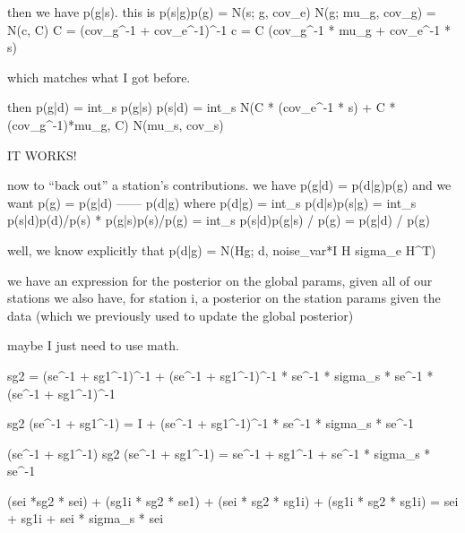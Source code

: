 \documentclass{article}
\begin{document}
then we have p(g|s). this is
p(s|g)p(g) = N(s; g, cov_e) N(g; mu_g, cov_g)
           = N(c, C)
C = (cov_g^-1 + cov_e^-1)^-1
c = C (cov_g^-1 * mu_g + cov_e^-1 * s)

which matches what I got before.

then p(g|d) = int_s p(g|s) p(s|d)
            = int_s N(C * (cov_e^-1 * s) + C * (cov_g^-1)*mu_g, C) N(mu_s, cov_s) 

IT WORKS!

now to ``back out'' a station's contributions.
we have p(g|d) = p(d|g)p(g)
and we want
p(g) = p(g|d)
       ------
       p(d|g)
where p(d|g) = int_s p(d|s)p(s|g)
             = int_s p(s|d)p(d)/p(s) * p(g|s)p(s)/p(g)
             = int_s p(s|d)p(g|s) / p(g)
             = p(g|d) / p(g)

well, we know explicitly that p(d|g) = N(Hg; d, noise_var*I H sigma_e H^T)

we have an expression for the posterior on the global params, given all of our stations
we also have, for station i, a posterior on the station params given the data
(which we previously used to update the global posterior)

maybe I just need to use math.

sg2 = (se^-1 + sg1^-1)^-1 + (se^-1 + sg1^-1)^-1 * se^-1 * sigma_s * se^-1 * (se^-1 + sg1^-1)^-1

sg2 (se^-1 + sg1^-1) = I + (se^-1 + sg1^-1)^-1 * se^-1 * sigma_s * se^-1

(se^-1 + sg1^-1) sg2 (se^-1 + sg1^-1) = se^-1 + sg1^-1 + se^-1 * sigma_s * se^-1

(sei *sg2 * sei) + (sg1i * sg2 * se1) + (sei * sg2 * sg1i) + (sg1i * sg2 * sg1i) = 
sei + sg1i + sei * sigma_s * sei
\end{document}
